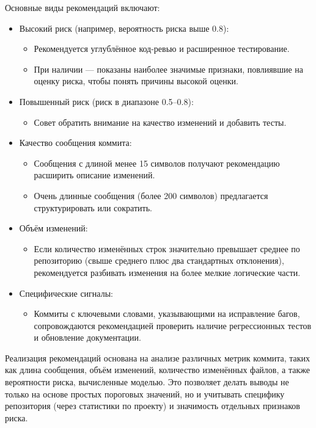 Основные виды рекомендаций включают:

\begin{itemize}
	\item Высокий риск (например, вероятность риска выше 0.8): 
	\begin{itemize}
		\item Рекомендуется углублённое код-ревью и расширенное тестирование.
		\item При наличии — показаны наиболее значимые признаки, повлиявшие на оценку риска, чтобы понять причины высокой оценки.
	\end{itemize}
	\item Повышенный риск (риск в диапазоне 0.5–0.8): 
	\begin{itemize}
		\item Совет обратить внимание на качество изменений и добавить тесты.
	\end{itemize}
	\item Качество сообщения коммита:
	\begin{itemize}
		\item Сообщения с длиной менее 15 символов получают рекомендацию расширить описание изменений.
		\item Очень длинные сообщения (более 200 символов) предлагается структурировать или сократить.
	\end{itemize}
	\item Объём изменений:
	\begin{itemize}
		\item Если количество изменённых строк значительно превышает среднее по репозиторию (свыше среднего плюс два стандартных отклонения), рекомендуется разбивать изменения на более мелкие логические части.
	\end{itemize}
	\item Специфические сигналы:
	\begin{itemize}
		\item Коммиты с ключевыми словами, указывающими на исправление багов, сопровождаются рекомендацией проверить наличие регрессионных тестов и обновление документации.
	\end{itemize}
\end{itemize}

Реализация рекомендаций основана на анализе различных метрик коммита, таких как длина сообщения, объём изменений, количество изменённых файлов, а также вероятности риска, вычисленные моделью. Это позволяет делать выводы не только на основе простых пороговых значений, но и учитывать специфику репозитория (через статистики по проекту) и значимость отдельных признаков риска.

